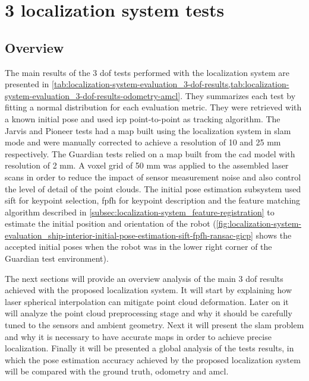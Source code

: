 \section{3  localization system tests}\label{sec:planar-localization-system-tests}


\subsection{Overview}

The main results of the 3 \gls{dof} tests performed with the localization system are presented in \cref{tab:localization-system-evaluation_3-dof-results,tab:localization-system-evaluation_3-dof-results-odometry-amcl}. They summarizes each test by fitting a normal distribution for each evaluation metric. They were retrieved with a known initial pose and used \gls{icp} point-to-point as tracking algorithm. The Jarvis and Pioneer tests had a map built using the localization system in \gls{slam} mode and were manually corrected to achieve a resolution of 10 and 25 mm respectively. The Guardian tests relied on a map built from the \gls{cad} model with resolution of 2 mm. A voxel grid of 50 mm was applied to the assembled laser scans in order to reduce the impact of sensor measurement noise and also control the level of detail of the point clouds. The initial pose estimation subsystem used \gls{sift} for keypoint selection, \gls{fpfh} for keypoint description and the feature matching algorithm described in \cref{subsec:localization-system_feature-registration} to estimate the initial position and orientation of the robot (\cref{fig:localization-system-evaluation_ship-interior-initial-pose-estimation-sift-fpfh-ransac-gicp} shows the accepted initial poses when the robot was in the lower right corner of the Guardian test environment).

The next sections will provide an overview analysis of the main 3 \gls{dof} results achieved with the proposed localization system. It will start by explaining how laser spherical interpolation can mitigate point cloud deformation. Later on it will analyze the point cloud preprocessing stage and why it should be carefully tuned to the sensors and ambient geometry. Next it will present the \gls{slam} problem and why it is necessary to have accurate maps in order to achieve precise localization. Finally it will be presented a global analysis of the tests results, in which the pose estimation accuracy achieved by the proposed localization system will be compared with the ground truth, odometry and \gls{amcl}.


